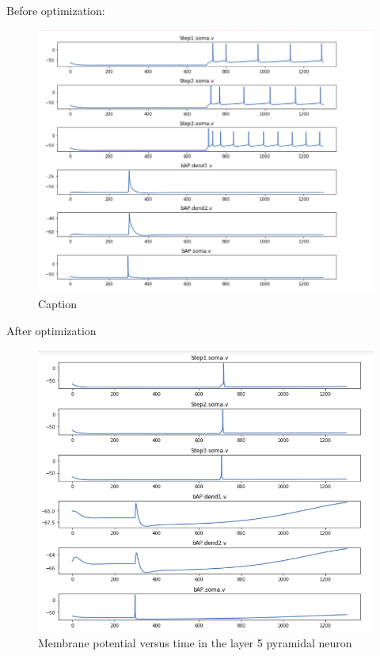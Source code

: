Before optimization:
\begin{figure}
    \centering
    \includegraphics{figures/l5pc_before_opt}
    \caption{Caption}
    \label{fig:my_label}
\end{figure}
After optimization

\begin{figure}
    \centering
    \includegraphics{figures/l5pc}
    \caption{Membrane potential versus time in the layer 5 pyramidal neuron}
    \label{fig:after_optimization}
\end{figure}

